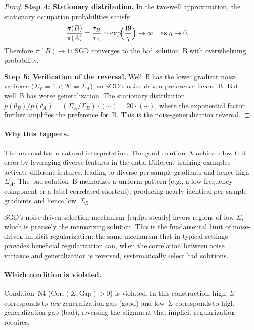 \documentclass[11pt,a4paper]{article}
\begin{document}
\begin{proof}
\medskip\noindent\textbf{Step~4: Stationary distribution.}
In the two-well approximation, the stationary occupation probabilities satisfy
\[
  \frac{\pi(B)}{\pi(A)}
  = \frac{\tau_B}{\tau_A}
  \sim \exp\!\Bigl(\frac{19}{\eta}\Bigr) \to \infty
  \quad\text{as } \eta\to 0.
\]
Therefore $\pi(B) \to 1$: SGD converges to the bad solution~B with
overwhelming probability.

\medskip\noindent\textbf{Step~5: Verification of the reversal.}
Well~B has the lower gradient noise variance ($\Sigma_B = 1 < 20 = \Sigma_A$),
so SGD's noise-driven preference favors~B.  But well~B has worse
generalization.  The stationary distribution
$p(\theta_B)/p(\theta_A) = (\Sigma_A/\Sigma_B)\cdot(\cdots) = 20\cdot(\cdots)$,
where the exponential factor further amplifies the preference for~B.
This is the noise-generalization reversal.
\end{proof}

\paragraph{Why this happens.}
The reversal has a natural interpretation.  The good solution~A achieves low
test error by leveraging diverse features in the data.  Different training
examples activate different features, leading to diverse per-sample gradients
and hence high $\Sigma_A$.  The bad solution~B memorizes a uniform pattern
(e.g., a low-frequency component or a label-correlated shortcut), producing
nearly identical per-sample gradients and hence low~$\Sigma_B$.

SGD's noise-driven selection mechanism~\eqref{eq:fpe-steady} favors regions
of low $\Sigma$, which is precisely the memorizing solution.  This is the
fundamental limit of noise-driven implicit regularization: the same mechanism
that in typical settings provides beneficial regularization can, when the
correlation between noise variance and generalization is reversed,
systematically select bad solutions.

\paragraph{Which condition is violated.}
Condition~N4 ($\mathrm{Corr}(\Sigma, \mathrm{Gap}) > 0$) is violated.
In this construction, high~$\Sigma$ corresponds to \emph{low} generalization
gap (good) and low~$\Sigma$ corresponds to high generalization gap (bad),
reversing the alignment that implicit regularization requires.

\end{document}
